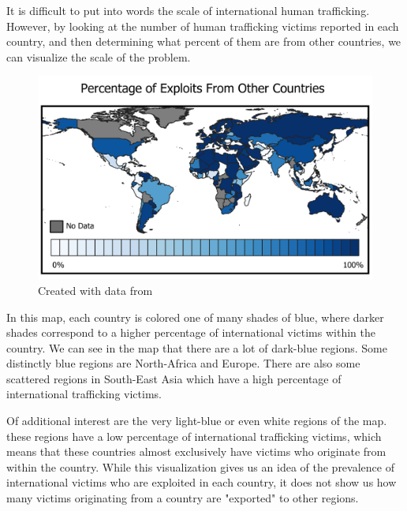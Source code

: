 \documentclass{article} %
\begin{document}
It is difficult to put into words the scale of international human trafficking. However, by looking at the number of human trafficking victims reported in each country, and then determining what percent of them are from other countries, we can visualize the scale of the problem.

\FloatBarrier

\begin{center}
	\begin{figure}[H]
		\includegraphics[width = 5.6in]{ProposalMap1}
		\scriptsize{\caption{Created with data from \cite{CTDC}}}
	\end{figure}
\end{center}
\FloatBarrier

In this map, each country is colored one of many shades of blue, where darker shades correspond to a higher percentage of international victims within the country. We can see in the map that there are a lot of dark-blue regions. Some distinctly blue regions are North-Africa and Europe. There are also some scattered regions in South-East Asia which have a high percentage of international trafficking victims. 

Of additional interest are the very light-blue or even white regions of the map. these regions have a low percentage of international trafficking victims, which means that these countries almost exclusively have victims who originate from within the country. While this visualization gives us an idea of the prevalence of international victims who are exploited in each country, it does not show us how many victims originating from a country are "exported" to other regions.

\FloatBarrier
\end{document}
